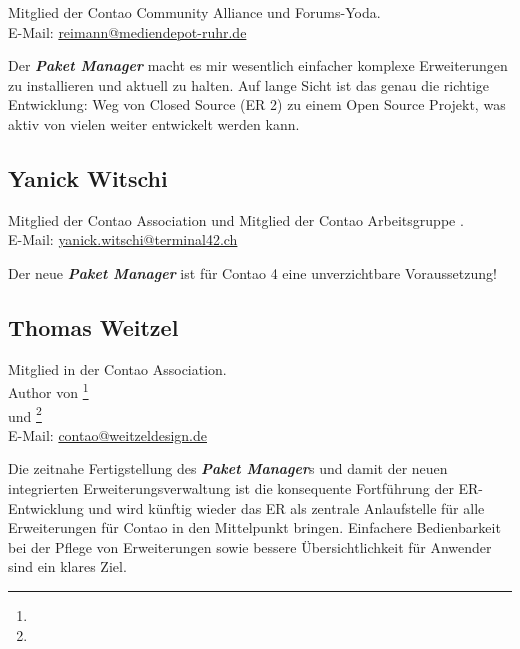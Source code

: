 \documentclass[
paper=a4,
draft=false,%
fontsize=10pt%
]{scrartcl}
\newcommand{\packageManager}{\textbf{\textit{Paket Manager}}}
\begin{document}
Mitglied der Contao Community Alliance und Forums-Yoda.\\
E-Mail: \href{mailto:reimann@mediendepot-ruhr.de}{reimann@mediendepot-ruhr.de}

\begin{emquote}{}
Der \packageManager{} macht es mir wesentlich einfacher komplexe Erweiterungen zu installieren und aktuell zu halten. Auf lange Sicht ist das genau die richtige Entwicklung: Weg von Closed Source (ER 2) zu einem Open Source Projekt, was aktiv von vielen weiter entwickelt werden kann.
\end{emquote}

\subsection*{Yanick  Witschi}

Mitglied der Contao Association und Mitglied der Contao Arbeitsgruppe .\\
E-Mail: \href{mailto:yanick.witschi@terminal42.ch}{yanick.witschi@terminal42.ch}

\begin{emquote}{}
Der neue \packageManager{} ist für Contao 4 eine unverzichtbare Voraussetzung!
\end{emquote}

\pagebreak

\subsection*{Thomas  Weitzel}

Mitglied in der Contao Association.\\
Author von \footnote{} \\
und \footnote{} \\
E-Mail: \href{mailto:contao@weitzeldesign.de}{contao@weitzeldesign.de}

\begin{emquote}{}
Die zeitnahe Fertigstellung des \packageManager{}s und damit der neuen integrierten Erweiterungsverwaltung ist die konsequente Fortführung der ER-Entwicklung und wird künftig wieder das ER als zentrale Anlaufstelle für alle Erweiterungen für Contao in den Mittelpunkt bringen. Einfachere Bedienbarkeit bei der Pflege von Erweiterungen sowie bessere Übersichtlichkeit für Anwender sind ein klares Ziel.
\end{emquote}
\end{document}
